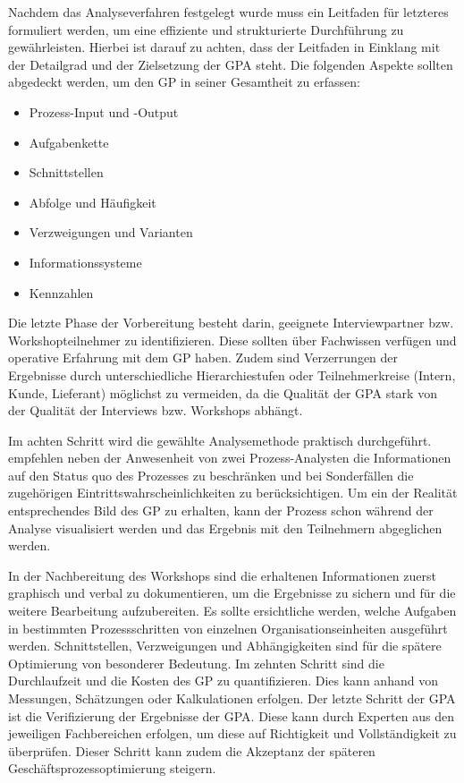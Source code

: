Nachdem das Analyseverfahren festgelegt wurde muss ein Leitfaden für letzteres formuliert werden, um eine effiziente und strukturierte Durchführung zu gewährleisten. Hierbei ist darauf zu achten, dass der Leitfaden in Einklang mit der Detailgrad und der Zielsetzung der GPA steht. Die folgenden Aspekte sollten abgedeckt werden, um den GP in seiner Gesamtheit zu erfassen: 

\begin{multicols}{2}
\begin{itemize}
    \singlespacing
    \item Prozess-Input und -Output
    \item Aufgabenkette
    \item Schnittstellen
    \item Abfolge und Häufigkeit
    \item Verzweigungen und Varianten
    \item Informationssysteme
    \item Kennzahlen
\end{itemize}
\end{multicols}

Die letzte Phase der Vorbereitung besteht darin, geeignete Interviewpartner bzw. Workshopteilnehmer zu identifizieren. Diese sollten über Fachwissen verfügen und operative Erfahrung mit dem GP haben. Zudem sind Verzerrungen der Ergebnisse durch unterschiedliche Hierarchiestufen oder Teilnehmerkreise (Intern, Kunde, Lieferant) möglichst zu vermeiden, da die Qualität der GPA stark von der Qualität der Interviews bzw. Workshops abhängt.

Im achten Schritt wird die gewählte Analysemethode praktisch durchgeführt. \cite{theorie_best_geschaftsprozesse_optimieren_2009} empfehlen neben der Anwesenheit von zwei Prozess-Analysten die Informationen auf den Status quo des Prozesses zu beschränken und bei Sonderfällen die zugehörigen Eintrittswahrscheinlichkeiten zu berücksichtigen. Um ein der Realität entsprechendes Bild des GP zu erhalten, kann der Prozess schon während der Analyse visualisiert werden und das Ergebnis mit den Teilnehmern abgeglichen werden.

In der Nachbereitung des Workshops sind die erhaltenen Informationen zuerst graphisch und verbal zu dokumentieren, um die Ergebnisse zu sichern und für die weitere Bearbeitung aufzubereiten. Es sollte ersichtliche werden, welche Aufgaben in bestimmten Prozessschritten von einzelnen Organisationseinheiten ausgeführt werden. Schnittstellen, Verzweigungen und Abhängigkeiten sind für die spätere Optimierung von besonderer Bedeutung.
Im zehnten Schritt sind die Durchlaufzeit und die Kosten des GP zu quantifizieren. Dies kann anhand von Messungen, Schätzungen oder Kalkulationen erfolgen. 
Der letzte Schritt der GPA ist die Verifizierung der Ergebnisse der GPA. Diese kann durch Experten aus den jeweiligen Fachbereichen erfolgen, um diese auf Richtigkeit und Vollständigkeit zu überprüfen. Dieser Schritt kann zudem die Akzeptanz der späteren Geschäftsprozessoptimierung steigern.

